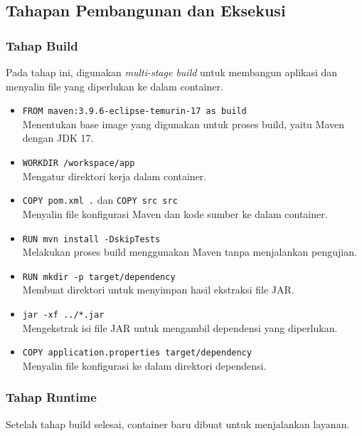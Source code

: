 \subsection{Tahapan Pembangunan dan Eksekusi}

\subsubsection{Tahap Build}
Pada tahap ini, digunakan \textit{multi-stage build} untuk membangun aplikasi dan menyalin file yang diperlukan ke dalam container.

\begin{itemize}
	\item \texttt{FROM maven:3.9.6-eclipse-temurin-17 as build} \\
	Menentukan base image yang digunakan untuk proses build, yaitu Maven dengan JDK 17.
	\item \texttt{WORKDIR /workspace/app} \\
	Mengatur direktori kerja dalam container.
	\item \texttt{COPY pom.xml .} dan \texttt{COPY src src} \\
	Menyalin file konfigurasi Maven dan kode sumber ke dalam container.
	\item \texttt{RUN mvn install -DskipTests} \\
	Melakukan proses build menggunakan Maven tanpa menjalankan pengujian.
	\item \texttt{RUN mkdir -p target/dependency} \\
	Membuat direktori untuk menyimpan hasil ekstraksi file JAR.
	\item \texttt{jar -xf ../*.jar} \\
	Mengekstrak isi file JAR untuk mengambil dependensi yang diperlukan.
	\item \texttt{COPY application.properties target/dependency} \\
	Menyalin file konfigurasi ke dalam direktori dependensi.
\end{itemize}

\subsubsection{Tahap Runtime}
Setelah tahap build selesai, container baru dibuat untuk menjalankan layanan.

